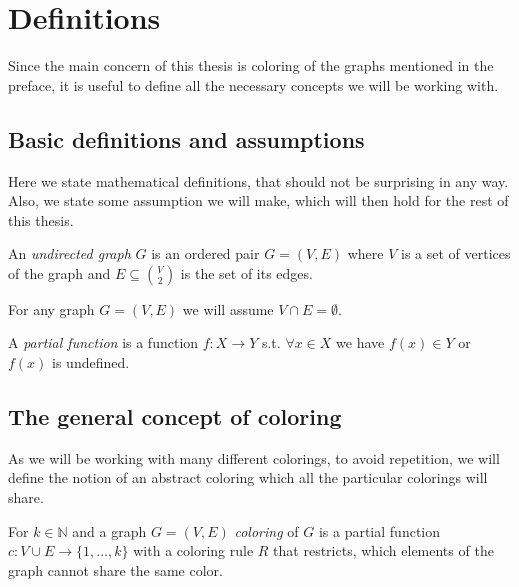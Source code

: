 \chapter{Definitions}

Since the main concern of this thesis is coloring of the graphs mentioned in the preface, it is useful to define all the necessary concepts we will be working with.

\section{Basic definitions and assumptions}

Here we state mathematical definitions, that should not be surprising in any way. Also, we state some assumption we will make, which will then hold for the rest of this thesis.

\begin{definition}
    An \textit{undirected graph} $G$ is an ordered pair $G=(V,E)$ where $V$ is a set of vertices of the graph and $E \subseteq \binom{V}{2}$ is the set of its edges. 
\end{definition}

\begin{assumption}
    For any graph $G=(V,E)$ we will assume $V \cap E = \emptyset$. 
\end{assumption}

\begin{definition}
    A \textit{partial function} is a function $f:X \rightarrow Y$ s.t. $\forall x \in X$ we have $f(x) \in Y$ or $f(x)$ is undefined.
\end{definition}

\section{The general concept of coloring}

As we will be working with many different colorings, to avoid repetition, we will define the notion of an abstract coloring which all the particular colorings will share.


\begin{definition}
    For $k \in \mathbb{N}$ and a graph $G=(V,E)$ \textit{coloring} of $G$ is a partial function $c: V \cup E \rightarrow \{1,\ldots,k\}$ with a coloring rule $R$ that restricts, which elements of the graph cannot share the same color.
\end{definition}


